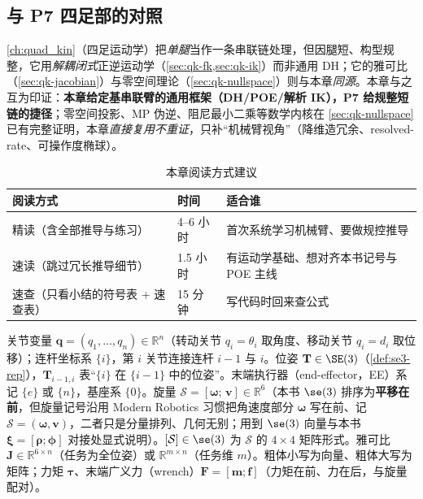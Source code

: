 \subsection*{与 P7 四足部的对照}
\cref{ch:quad_kin}（四足运动学）把\emph{单腿}当作一条串联链处理，但因腿短、构型规整，它用\emph{解耦闭式}正逆运动学（\cref{sec:qk-fk,sec:qk-ik}）而非通用 DH；它的雅可比（\cref{sec:qk-jacobian}）与零空间理论（\cref{sec:qk-nullspace}）则与本章\emph{同源}。本章与之互为印证：\textbf{本章给定基串联臂的通用框架（DH/POE/解析 IK），P7 给规整短链的捷径}；零空间投影、MP 伪逆、阻尼最小二乘等数学内核在 \cref{sec:qk-nullspace} 已有完整证明，本章\emph{直接复用不重证}，只补“机械臂视角”（降维造冗余、resolved-rate、可操作度椭球）。

\begin{table}[H]\centering\small
\caption{本章阅读方式建议}
\begin{tabular}{lll}
\toprule
阅读方式 & 时间 & 适合谁 \\
\midrule
精读（含全部推导与练习） & 4--6 小时 & 首次系统学习机械臂、要做规控推导 \\
速读（跳过冗长推导细节） & 1.5 小时 & 有运动学基础、想对齐本书记号与 POE 主线 \\
速查（只看小结的符号表 + 速查表） & 15 分钟 & 写代码时回来查公式 \\
\bottomrule
\end{tabular}
\end{table}

\begin{note}[本章记号与约定]\label{note:ak-notation}
关节变量 $\mathbf{q}=(q_1,\dots,q_n)\in\mathbb{R}^n$（转动关节 $q_i=\theta_i$ 取角度、移动关节 $q_i=d_i$ 取位移）；连杆坐标系 $\{i\}$，第 $i$ 关节连接连杆 $i-1$ 与 $i$。位姿 $\mathbf{T}\in\SE(3)$（\cref{def:se3-rep}），$\mathbf{T}_{i-1,i}$ 表“$\{i\}$ 在 $\{i-1\}$ 中的位姿”。末端执行器（end-effector，EE）系记 $\{e\}$ 或 $\{n\}$，基座系 $\{0\}$。旋量 $\mathcal{S}=[\boldsymbol{\omega};\,\mathbf{v}]\in\mathbb{R}^6$（本书 $\se(3)$ 排序为\textbf{平移在前}，但旋量记号沿用 Modern Robotics 习惯把角速度部分 $\boldsymbol{\omega}$ 写在前、记 $\mathcal{S}=(\boldsymbol{\omega},\mathbf{v})$，二者只是分量排列、几何无别；用到 $\se(3)$ 向量与本书 $\boldsymbol{\xi}=[\boldsymbol{\rho};\boldsymbol{\phi}]$ 对接处显式说明）。$[\mathcal{S}]\in\se(3)$ 为 $\mathcal{S}$ 的 $4\times4$ 矩阵形式。雅可比 $\mathbf{J}\in\mathbb{R}^{6\times n}$（任务为全位姿）或 $\mathbb{R}^{m\times n}$（任务维 $m$）。粗体小写为向量、粗体大写为矩阵；力矩 $\boldsymbol{\tau}$、末端广义力（wrench）$\mathbf{F}=[\mathbf{m};\mathbf{f}]$（力矩在前、力在后，与旋量配对）。
\end{note}

